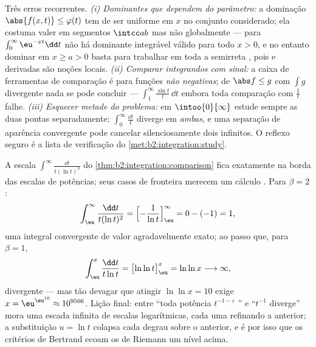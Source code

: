 \begin{remark}
Três erros recorrentes. \emph{(i) Dominantes que dependem do
parâmetro:} a dominação $\abs{f(x,t)} \leq \varphi(t)$ tem de
ser uniforme em $x$ no conjunto considerado; ela costuma valer em
segmentos $\intcc ab$ mas não globalmente --- para
$\int_0^\infty\eu^{-xt}\dd t$ não há dominante integrável
válido para todo $x > 0$, e no entanto dominar em $x \geq a > 0$ basta
para trabalhar em toda a semirreta , pois 
e derivadas são noções locais. \emph{(ii) Comparar integrandos
com sinal:} a caixa de ferramentas de comparação é para funções
\emph{não negativas}; de $\abs f \leq g$ com $\int g$ divergente nada se pode
concluir --- $\int_1^\infty\frac{\sin t}t\,\dd t$
 embora toda comparação com $\frac1t$ falhe.
\emph{(iii) Esquecer metade do problema:} em
$\intoo{0}{\infty}$ estude sempre as duas pontas separadamente;
$\int_0^\infty\frac{\dd t}{t}$ diverge em \emph{ambas}, e uma separação
de aparência convergente pode cancelar silenciosamente dois infinitos.
O reflexo seguro é a lista de verificação do
\cref{met:b2:integration:study}.
\end{remark}

\begin{example}\label{ex:b2:integration:bertrandboundary}
A escala $\int^\infty\frac{\dd t}{t(\ln t)^\beta}$ do
\cref{thm:b2:integration:comparison} fica exatamente na borda
das escalas de potências; seus casos de fronteira merecem um
cálculo . Para $\beta = 2$:
\[
\int_\eu^{\infty}\frac{\dd t}{t(\ln t)^2}
= \Bigl[-\frac{1}{\ln t}\Bigr]_\eu^{\infty}
= 0 - (-1) = 1 ,
\]
uma integral convergente de valor agradavelmente exato; ao passo que, para
$\beta = 1$,
\[
\int_\eu^{x}\frac{\dd t}{t\ln t}
= \bigl[\ln\ln t\bigr]_\eu^{x} = \ln\ln x
\longrightarrow \infty ,
\]
divergente --- mas tão devagar que atingir $\ln\ln x = 10$
exige $x = \eu^{\eu^{10}} \approx 10^{9566}$. Lição
final: entre ``toda potência $t^{-1-\varepsilon}$
'' e ``$t^{-1}$ diverge'' mora uma escada infinita
de escalas logarítmicas, cada uma refinando a anterior; a substituição
$u = \ln t$ colapsa cada degrau sobre o anterior, e é por isso
que os critérios de Bertrand ecoam os de Riemann um nível
acima.
\end{example}

